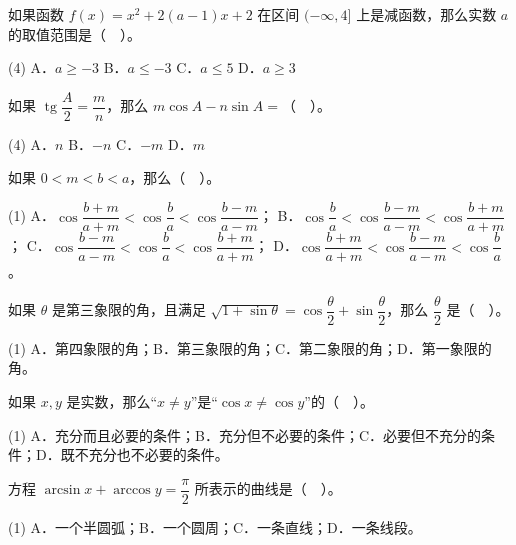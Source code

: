 \begin{question}
如果函数 $f(x)=x^2+2(a-1)x+2$ 在区间 $(-\infty,4]$ 上是减函数，那么实数 $a$ 的取值范围是（　）。

\begin{gkopts}(4)
\task A．$a\ge-3$
\task B．$a\le-3$
\task C．$a\le5$
\task D．$a\ge3$
\end{gkopts}

\end{question}
\begin{question}
如果 $\operatorname{tg}\dfrac A2=\dfrac mn$，那么 $m\cos A-n\sin A=$（　）。

\begin{gkopts}(4)
\task A．$n$
\task B．$-n$
\task C．$-m$
\task D．$m$
\end{gkopts}

\end{question}
\begin{question}
如果 $0<m<b<a$，那么（　）。

\begin{gkopts}(1)
\task A．$\cos\dfrac{b+m}{a+m}<\cos\dfrac ba<\cos\dfrac{b-m}{a-m}$；
\task B．$\cos\dfrac ba<\cos\dfrac{b-m}{a-m}<\cos\dfrac{b+m}{a+m}$；
\task C．$\cos\dfrac{b-m}{a-m}<\cos\dfrac ba<\cos\dfrac{b+m}{a+m}$；
\task D．$\cos\dfrac{b+m}{a+m}<\cos\dfrac{b-m}{a-m}<\cos\dfrac ba$。
\end{gkopts}

\end{question}
\begin{question}
如果 $\theta$ 是第三象限的角，且满足 $\sqrt{1+\sin\theta}=\cos\dfrac\theta2+\sin\dfrac\theta2$，那么 $\dfrac\theta2$ 是（　）。

\begin{gkopts}(1)
\task A．第四象限的角；B．第三象限的角；C．第二象限的角；D．第一象限的角。
\end{gkopts}

\end{question}
\begin{question}
如果 $x,y$ 是实数，那么“$x\ne y$”是“$\cos x\ne\cos y$”的（　）。

\begin{gkopts}(1)
\task A．充分而且必要的条件；B．充分但不必要的条件；C．必要但不充分的条件；D．既不充分也不必要的条件。
\end{gkopts}

\end{question}
\begin{question}
方程 $\arcsin x+\arccos y=\dfrac\pi2$ 所表示的曲线是（　）。

\begin{gkopts}(1)
\task A．一个半圆弧；B．一个圆周；C．一条直线；D．一条线段。
\end{gkopts}

\end{question}
